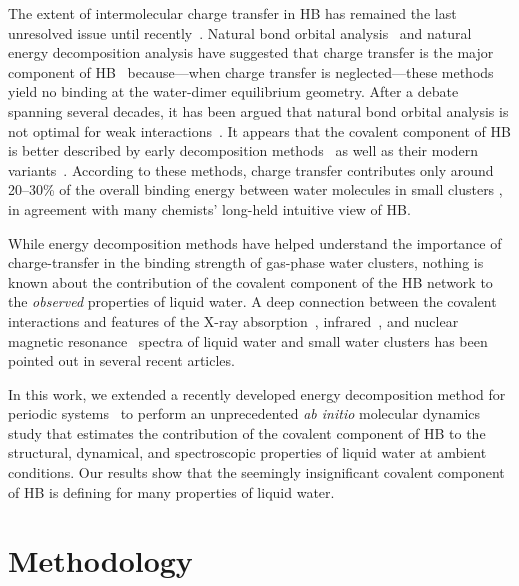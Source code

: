 \documentclass[10pt,amsmath,twocolumn,aps,prl,superscriptaddress,floatfix]{revtex4-1}
\begin{document}
The extent of intermolecular charge transfer in HB has remained the last unresolved issue until recently~\cite{isaacs1999covalency, ghanty2000hydrogen, stone2017natural}. 
Natural bond orbital analysis~\cite{weinhold1998natural} and natural energy decomposition analysis \cite{glendening1994natural} have suggested that charge transfer is the major component of HB~\cite{schenter1996natural,glendening2005natural,weinhold2005resonance} because---when charge transfer is neglected---these methods yield no binding at the water-dimer equilibrium geometry. 
After a debate spanning several decades, it has been argued that natural bond orbital analysis is not optimal for weak interactions~\cite{stone2017natural}. 
It appears that the covalent component of HB is better described by early decomposition methods~\cite{kitaura1976new, bagus1984new, bagus1992decomposition, stevens1987frozen, chen1996energy, stone1993computation} as well as their modern variants~\cite{mo2000energy, misquitta2013charge, khaliullin2007unravelling}. 
According to these methods, charge transfer contributes only around 20--30\% of the overall binding energy between water molecules in small clusters \cite{stevens1987frozen, stone1993computation, chen1996energy, piquemal2005csov, khaliullin2009electron, cobar2012examination}, in agreement with many chemists' long-held intuitive view of HB.

While energy decomposition methods have helped understand the importance of charge-transfer in the binding strength of gas-phase water clusters, nothing is known about the contribution of the covalent component of the HB network to the \emph{observed} properties of liquid water. 
A deep connection between the covalent interactions and features of the X-ray absorption~\cite{fransson2016x, NatureComm2013}, infrared~\cite{JPCL2013, Faraday2011, lenz2006theoretical}, and nuclear magnetic resonance~\cite{NatureComm2015} spectra of liquid water and small water clusters has been pointed out in several recent articles. 

In this work, we extended a recently developed energy decomposition method for periodic systems~\cite{Khaliullin2013JCTC} to perform an unprecedented \emph{ab initio} molecular dynamics study that estimates the contribution of the covalent component of HB to the structural, dynamical, and spectroscopic properties of liquid water at ambient conditions. 
Our results show that the seemingly insignificant covalent component of HB is defining for many properties of liquid water. 

\section{Methodology}
\end{document}
